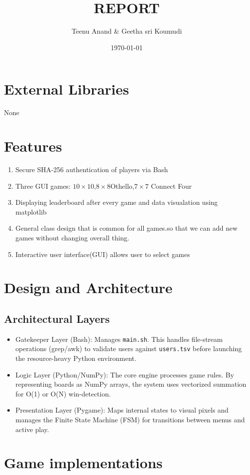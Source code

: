 \documentclass{article}
\title{REPORT}
\author{Teenu Anand \& Geetha sri Koumudi}
\date{\today}
\begin{document}
\maketitle
\tableofcontents
\section{External Libraries}
 None
\section{Features}
\begin{enumerate}
    \item Secure SHA-256 authentication of players via Bash
    \item Three GUI games: $10 \times 10$,$8 \times 8$Othello,$7 \times 7$ Connect Four
    \item Displaying leaderboard after every game and data visualation using matplotlib
    \item General class design that is common for all games.so that we can add new games without changing overall thing.
    \item Interactive user interface(GUI) allows user to select games 
\end{enumerate}
\section{Design and Architecture}
\subsection{Architectural Layers}
\begin{itemize}
    \item Gatekeeper Layer (Bash): Manages \texttt{main.sh}. This handles file-stream operations (grep/awk) to validate users against \texttt{users.tsv} before launching the resource-heavy Python environment.
    \item Logic Layer (Python/NumPy): The core engine processes game rules. By representing boards as NumPy arrays, the system uses vectorized summation for O(1) or O(N) win-detection.
    \item Presentation Layer (Pygame): Maps internal states to visual pixels and manages the Finite State Machine (FSM) for transitions between menus and active play.
\end{itemize}
\section{Game implementations}
\end{document}
